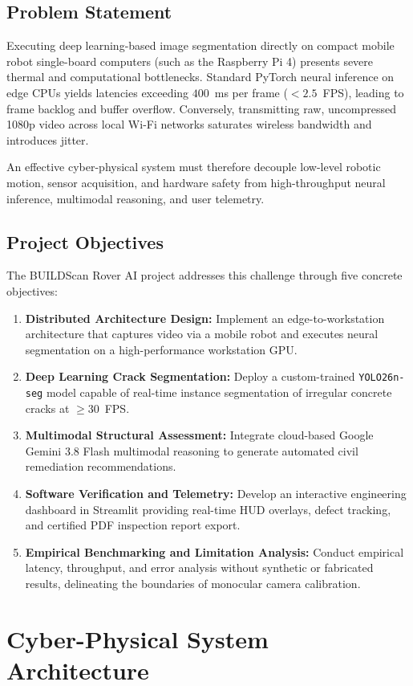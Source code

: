 \documentclass[12pt,a4paper,oneside]{report}
\begin{document}
\section{Problem Statement}
Executing deep learning-based image segmentation directly on compact mobile robot single-board computers (such as the Raspberry Pi 4) presents severe thermal and computational bottlenecks. Standard PyTorch neural inference on edge CPUs yields latencies exceeding $400$~ms per frame ($<2.5$~FPS), leading to frame backlog and buffer overflow. Conversely, transmitting raw, uncompressed 1080p video across local Wi-Fi networks saturates wireless bandwidth and introduces jitter. 

An effective cyber-physical system must therefore decouple low-level robotic motion, sensor acquisition, and hardware safety from high-throughput neural inference, multimodal reasoning, and user telemetry.

\section{Project Objectives}
The BUILDScan Rover AI project addresses this challenge through five concrete objectives:
\begin{enumerate}
  \item \textbf{Distributed Architecture Design:} Implement an edge-to-workstation architecture that captures video via a mobile robot and executes neural segmentation on a high-performance workstation GPU.
  \item \textbf{Deep Learning Crack Segmentation:} Deploy a custom-trained \texttt{YOLO26n-seg} model capable of real-time instance segmentation of irregular concrete cracks at $\ge 30$~FPS.
  \item \textbf{Multimodal Structural Assessment:} Integrate cloud-based Google Gemini 3.8 Flash multimodal reasoning to generate automated civil remediation recommendations.
  \item \textbf{Software Verification and Telemetry:} Develop an interactive engineering dashboard in Streamlit providing real-time HUD overlays, defect tracking, and certified PDF inspection report export.
  \item \textbf{Empirical Benchmarking and Limitation Analysis:} Conduct empirical latency, throughput, and error analysis without synthetic or fabricated results, delineating the boundaries of monocular camera calibration.
\end{enumerate}


\chapter{Cyber-Physical System Architecture}
\label{ch:arch}
\end{document}
